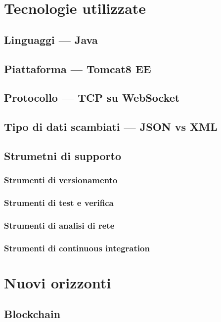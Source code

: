 \section{Tecnologie utilizzate}
   \subsection{Linguaggi --- Java}

   \subsection{Piattaforma --- Tomcat8 EE}

   \subsection{Protocollo --- TCP su WebSocket}

   \subsection{Tipo di dati scambiati --- JSON vs XML}
   \subsection{Strumetni di supporto}
      \subsubsection{Strumenti di versionamento}
      \subsubsection{Strumenti di test e verifica}
      \subsubsection{Strumenti di analisi di rete}
      \subsubsection{Strumenti di continuous integration}
\section{Nuovi orizzonti}
   \subsection{Blockchain}
